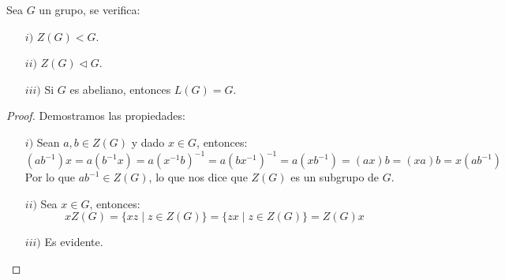 \begin{prop}
    Sea $G$ un grupo, se verifica:
    \begin{enumerate}
        \item[$i)$] $Z(G)<G$.
        \item[$ii)$] $Z(G)\lhd G$.
        \item[$iii)$] Si $G$ es abeliano, entonces $L(G) = G$.
    \end{enumerate}
    \begin{proof}
        Demostramos las propiedades:
        \begin{enumerate}
            \item[$i)$] Sean $a,b\in Z(G)$ y dado $x\in G$, entonces:
                \begin{equation*}
                    (ab^{-1})x = a(b^{-1}x) = a{(x^{-1}b)}^{-1} = a{(bx^{-1})}^{-1} = a(xb^{-1}) = (ax)b = (xa)b = x(ab^{-1})
                \end{equation*}
                Por lo que $ab^{-1}\in Z(G)$, lo que nos dice que $Z(G)$ es un subgrupo de $G$.
            \item[$ii)$] Sea $x\in G$, entonces:
                \begin{equation*}
                    xZ(G) = \{xz \mid z\in Z(G)\} = \{zx \mid z\in Z(G)\} = Z(G)x
                \end{equation*}
            \item[$iii)$] Es evidente.
        \end{enumerate}
    \end{proof}
\end{prop}

